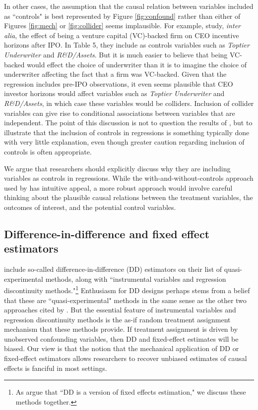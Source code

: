 \documentclass[11pt,reqno]{amsart}
\begin{document}
\begin{doublespace}
In other cases, the assumption that the causal relation between variables included as ``controls" is best represented by Figure \ref{fig:confound} rather than either of Figures \ref{fig:mech} or \ref{fig:collider} seems implausible.
For example, \citet{Cadman:2014cr} study, \emph{inter alia}, the effect of being a venture capital (VC)-backed firm on CEO incentive horizons after IPO.
In Table 5, they include as controls variables such as \emph{Toptier Underwriter} and \emph{R\&D/Assets}.
But it is much easier to believe that being VC-backed would effect the choice of underwriter than it is to imagine the choice of underwriter affecting the fact that a firm was VC-backed.
Given that the regression includes pre-IPO observations, it even seems plausible that CEO investor horizons would affect variables such as \emph{Toptier Underwriter} and \emph{R\&D/Assets}, in which case these variables would be colliders.
Inclusion of collider variables can give rise to conditional associations between variables that are independent.
The point of this discussion is not to question the results of  \citet{Cadman:2014cr}, but to illustrate that the inclusion of controls in regressions is something typically done with very little explanation, even though greater caution regarding inclusion of controls is often appropriate.

We argue that researchers should explicitly discuss why they are including variables as controls in regressions.
While the with-and-without-controls approach used by \citet{Larcker:2011bw} has intuitive appeal, a more robust approach would involve careful thinking about the plausible causal relations between the treatment variables, the outcomes of interest, and the potential control variables.

\subsection{Difference-in-difference and fixed effect estimators}
\citet[p.\,12]{Angrist:2010jv} include so-called difference-in-difference (DD) estimators on their list of quasi-experimental methods, along with ``instrumental variables and regression discontinuity methods."\footnote{As \citet[p.\,228]{Angrist:2008vk} argue that ``DD is a version of fixed effects estimation," we discuss these methods together.}
Enthusiasm for DD designs perhaps stems from a belief that these are ``quasi-experimental" methods in the same sense as the other two approaches cited by \citet[p.\,12]{Angrist:2010jv}.
But the essential feature of instrumental variables and regression discontinuity methods is the as-if random treatment assignment mechanism that these methods provide.
If treatment assignment is driven by unobserved confounding variables, then DD and fixed-effect estimates will be biased.
Our view is that the notion that the mechanical application of DD or fixed-effect estimators allows researchers to recover unbiased estimates of causal effects is fanciful in most settings.


\end{doublespace}
\end{document}
